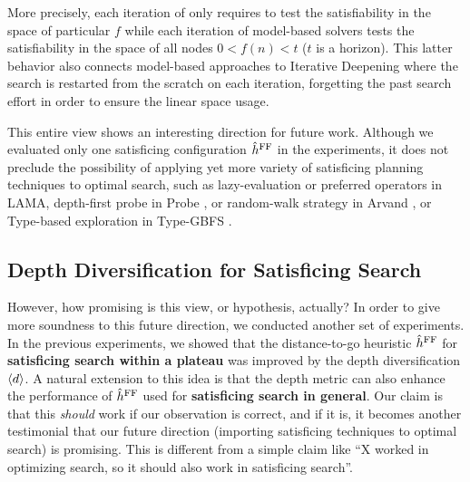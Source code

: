 More precisely, each iteration of \astar only requires to test the satisfiability in the space of particular
$f$ while each iteration of model-based solvers tests the satisfiability in the space of all nodes $0<f(n)<t$
($t$ is a horizon).  This latter behavior also connects model-based approaches to Iterative Deepening \astar
\cite{korf1985depth} where the search is restarted from the scratch on each iteration, forgetting the past search
effort in order to ensure the linear space usage.
% 
% 

This entire view shows an interesting direction for future work.
Although we evaluated only one \sota satisficing configuration $\hat{h}^{\text{FF}}$ in
the experiments, it does not preclude the possibility of applying yet
more variety of satisficing planning techniques to optimal search, such as lazy-evaluation
or preferred operators in LAMA, depth-first probe in Probe \cite{LipovetzkyG11}, or
random-walk strategy in Arvand \cite{nakhost2009monte}, or Type-based
exploration in Type-GBFS \cite{xie14type}.

\subsection{Depth Diversification for Satisficing Search}

However, how promising is this view, or hypothesis, actually? In order to give more soundness to this future
direction, we conducted another set of experiments. In the previous experiments, we showed that the distance-to-go
\ff heuristic $\hat{h}^{\text{FF}}$ for \textbf{satisficing search within a plateau} was improved by the depth diversification
${\left<d\right>}$.
% 
A natural extension to this idea is that the depth metric can also enhance the performance of $\hat{h}^{\text{FF}}$ used for
\textbf{satisficing search in general}.
% 
Our claim is that this \emph{should} work if our observation is correct, and if it is, it becomes another
testimonial that our future direction (importing satisficing techniques to optimal search) is promising.
This is different from a simple claim like ``X worked in optimizing search, so it should also work in satisficing search''.

